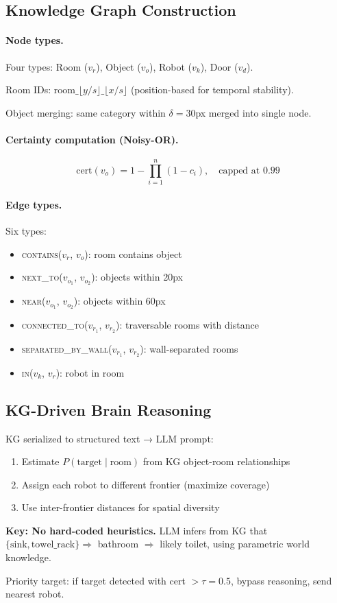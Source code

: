 \subsection{Knowledge Graph Construction}

\paragraph{Node types.} Four types: Room ($v_r$), Object ($v_o$), Robot ($v_k$), Door ($v_d$).

Room IDs: $\text{room}\_{\lfloor y/s \rfloor}\_{\lfloor x/s \rfloor}$ (position-based for temporal stability).

Object merging: same category within $\delta=30$px merged into single node.

\paragraph{Certainty computation (Noisy-OR).}
\begin{equation}
    \text{cert}(v_o) = 1 - \prod_{i=1}^{n} (1 - c_i), \quad \text{capped at } 0.99
\end{equation}

\paragraph{Edge types.} Six types:
\begin{itemize}
    \item \textsc{contains}($v_r$, $v_o$): room contains object
    \item \textsc{next\_to}($v_{o_1}$, $v_{o_2}$): objects within 20px
    \item \textsc{near}($v_{o_1}$, $v_{o_2}$): objects within 60px
    \item \textsc{connected\_to}($v_{r_1}$, $v_{r_2}$): traversable rooms with distance
    \item \textsc{separated\_by\_wall}($v_{r_1}$, $v_{r_2}$): wall-separated rooms
    \item \textsc{in}($v_k$, $v_r$): robot in room
\end{itemize}

\subsection{KG-Driven Brain Reasoning}

KG serialized to structured text → LLM prompt:
\begin{enumerate}
    \item Estimate $P(\text{target} \mid \text{room})$ from KG object-room relationships
    \item Assign each robot to different frontier (maximize coverage)
    \item Use inter-frontier distances for spatial diversity
\end{enumerate}

\textbf{Key: No hard-coded heuristics.} LLM infers from KG that $\{\text{sink}, \text{towel\_rack}\} \Rightarrow$ bathroom $\Rightarrow$ likely toilet, using parametric world knowledge.

Priority target: if target detected with cert $> \tau = 0.5$, bypass reasoning, send nearest robot.
